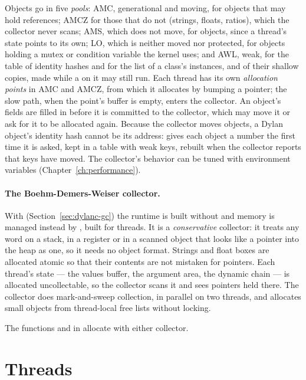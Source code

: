Objects go in five \emph{pools}: AMC, generational and moving, for
objects that may hold references; AMCZ for those that do not (strings,
floats, ratios), which the collector never scans; AMS, which does not
move, for  objects, since a thread's state points to its
own; LO, which is neither moved nor protected, for objects holding a
mutex or condition variable the kernel uses; and AWL, weak, for the
table of identity hashes and for the list of a class's instances, and
of their shallow copies, made while a  on it may still
run. Each thread has its own \emph{allocation
points} in AMC and AMCZ, from which it allocates by bumping a pointer;
the slow path, when the point's buffer is empty, enters the collector.
An object's fields are filled in before it is committed to the
collector, which may move it or ask for it to be allocated again.
Because the collector moves objects, a Dylan object's identity hash
cannot be its address:  gives each object a number
the first time it is asked, kept in a table with weak keys, rebuilt when
the collector reports that keys have moved. The collector's behavior can
be tuned with environment variables (Chapter~\ref{ch:performance}).

\paragraph{The Boehm-Demers-Weiser collector.} 
With  (Section~\ref{sec:dylanc-gc}) the
runtime is built without  and memory is managed instead by
, built for threads. It is a \emph{conservative} collector:
it treats any word on a stack, in a register or in a scanned object that
looks like a pointer into the heap as one, so it needs no object format.
Strings and float boxes are allocated atomic so that their contents are
not mistaken for pointers. Each thread's state --- the values buffer, the
argument area, the dynamic chain --- is allocated uncollectable, so the
collector scans it and sees pointers held there. The collector does
mark-and-sweep collection, in parallel on two threads, and allocates
small objects from thread-local free lists without locking.

The functions  and  in
 allocate with either collector.

\section{Threads}\label{sec:internals-threads}


